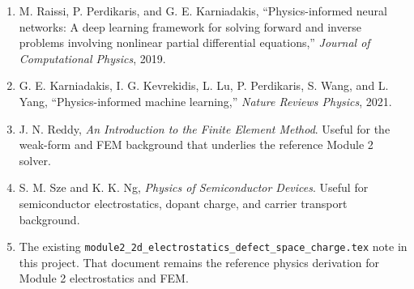 \documentclass[11pt]{article}
\begin{document}
\begin{enumerate}[leftmargin=2em]
    \item M. Raissi, P. Perdikaris, and G. E. Karniadakis, ``Physics-informed neural networks: A deep learning framework for solving forward and inverse problems involving nonlinear partial differential equations,'' \emph{Journal of Computational Physics}, 2019.
    \item G. E. Karniadakis, I. G. Kevrekidis, L. Lu, P. Perdikaris, S. Wang, and L. Yang, ``Physics-informed machine learning,'' \emph{Nature Reviews Physics}, 2021.
    \item J. N. Reddy, \emph{An Introduction to the Finite Element Method}. Useful for the weak-form and FEM background that underlies the reference Module 2 solver.
    \item S. M. Sze and K. K. Ng, \emph{Physics of Semiconductor Devices}. Useful for semiconductor electrostatics, dopant charge, and carrier transport background.
    \item The existing \texttt{module2\_2d\_electrostatics\_defect\_space\_charge.tex} note in this project. That document remains the reference physics derivation for Module 2 electrostatics and FEM.
\end{enumerate}
\end{document}

